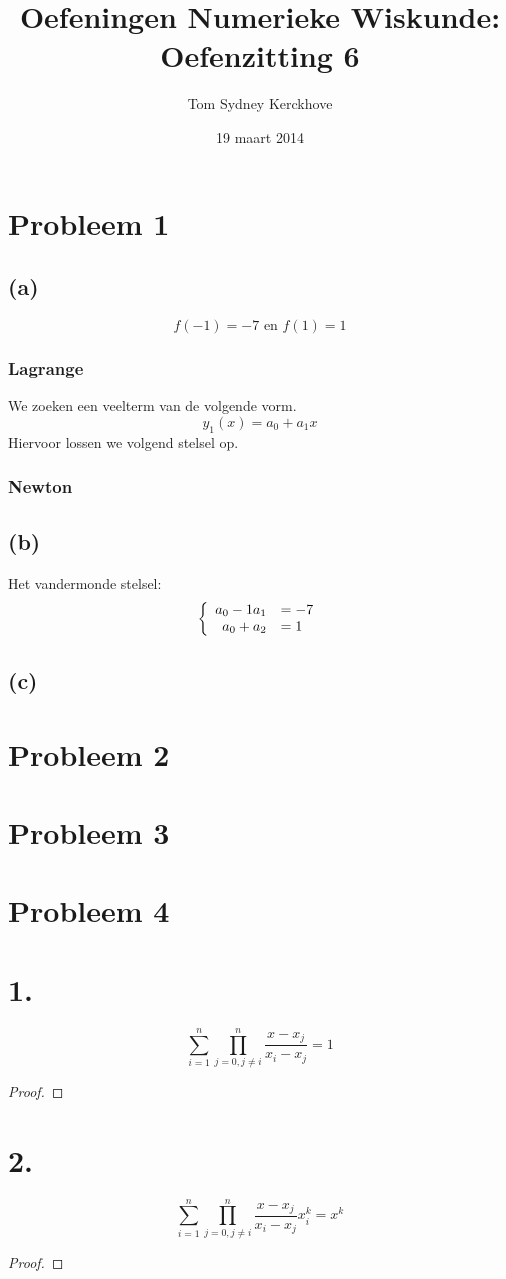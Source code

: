 \documentclass[12pt,a4paper]{article}
\author{Tom Sydney Kerckhove}
\title{Oefeningen Numerieke Wiskunde:\\ Oefenzitting 6}
\date{19 maart 2014}
\begin{document}
\maketitle

\section{Probleem 1}
\subsection*{(a)}
\[
f(-1) = -7 \text{ en } f(1) = 1
\]
\subsubsection*{Lagrange}
We zoeken een veelterm van de volgende vorm.
\[
y_1(x) = a_0 + a_1x
\]
Hiervoor lossen we volgend stelsel op.


\subsubsection*{Newton}


\subsection*{(b)}
Het vandermonde stelsel:
\[
\left\{
\begin{array}{r l}
a_0 - 1a_1 &= -7\\
a_0 +  a_2 &= 1\\
\end{array}
\right.
\]
\subsection*{(c)}

\section{Probleem 2}
\section{Probleem 3}
\section{Probleem 4}
\section*{1.}
\[
\sum_{i=1}^{n}\prod_{j=0,j\neq i}^{n}\frac{x-x_j}{x_i-x_j}=1
\]
\begin{proof}

\end{proof}

\section*{2.}
\[
\sum_{i=1}^{n}\prod_{j=0,j\neq i}^{n}\frac{x-x_j}{x_i-x_j}x_{i}^{k}=x^{k}
\]
\begin{proof}

\end{proof}
\end{document}
